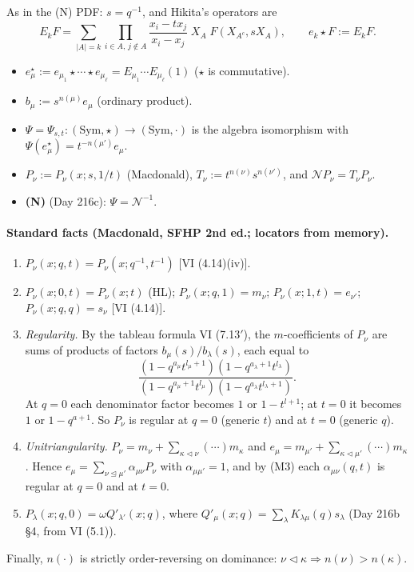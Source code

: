 \documentclass[11pt]{article}
\theoremstyle{definition}
\newcommand{\cN}{\mathcal{N}}
\newcommand{\domd}{\trianglelefteq}
\newcommand{\sdomd}{\triangleleft}
\begin{document}
As in the (N) PDF: $s=q^{-1}$, and Hikita's operators are
\[
E_kF=\sum_{|A|=k}\prod_{i\in A,\,j\notin A}\frac{x_i-tx_j}{x_i-x_j}\;X_A\;F(X_{A^c},sX_A),\qquad e_k\star F:=E_kF.
\]
\begin{itemize}[nosep]
\item $e^\star_\mu:=e_{\mu_1}\star\cdots\star e_{\mu_\ell}=E_{\mu_1}\cdots E_{\mu_\ell}(1)$ ($\star$ is commutative).
\item $b_\mu:=s^{n(\mu)}e_\mu$ (ordinary product).
\item $\Psi=\Psi_{s,t}:(\mathrm{Sym},\star)\to(\mathrm{Sym},\cdot)$ is the algebra isomorphism with $\Psi(e^\star_\mu)=t^{-n(\mu')}e_\mu$.
\item $P_\nu:=P_\nu(x;s,1/t)$ (Macdonald), $T_\nu:=t^{n(\nu)}s^{n(\nu')}$, and $\cN P_\nu=T_\nu P_\nu$.
\item \textbf{(N)} (Day 216c): $\Psi=\cN^{-1}$.
\end{itemize}

\paragraph{Standard facts (Macdonald, SFHP 2nd ed.; locators from memory).}
\begin{enumerate}[label=(M\arabic*),nosep]
\item $P_\nu(x;q,t)=P_\nu(x;q^{-1},t^{-1})$ [VI (4.14)(iv)].
\item $P_\nu(x;0,t)=P_\nu(x;t)$ (HL); $P_\nu(x;q,1)=m_\nu$; $P_\nu(x;1,t)=e_{\nu'}$; $P_\nu(x;q,q)=s_\nu$ [VI (4.14)].
\item \emph{Regularity.} By the tableau formula VI (7.13$'$), the $m$-coefficients of $P_\nu$ are sums of products of factors $b_\mu(s)/b_\lambda(s)$, each equal to
\[\frac{(1-q^{a_\mu}t^{l_\mu+1})(1-q^{a_\lambda+1}t^{l_\lambda})}{(1-q^{a_\mu+1}t^{l_\mu})(1-q^{a_\lambda}t^{l_\lambda+1})}.\]
At $q=0$ each denominator factor becomes $1$ or $1-t^{l+1}$; at $t=0$ it becomes $1$ or $1-q^{a+1}$. So $P_\nu$ is regular at $q=0$ (generic $t$) and at $t=0$ (generic $q$).
\item \emph{Unitriangularity.} $P_\nu=m_\nu+\sum_{\kappa\sdomd\nu}(\cdots)m_\kappa$ and $e_\mu=m_{\mu'}+\sum_{\kappa\sdomd\mu'}(\cdots)m_\kappa$. Hence $e_\mu=\sum_{\nu\domd\mu'}\alpha_{\mu\nu}P_\nu$ with $\alpha_{\mu\mu'}=1$, and by (M3) each $\alpha_{\mu\nu}(q,t)$ is regular at $q=0$ and at $t=0$.
\item $P_\lambda(x;q,0)=\omega Q'_{\lambda'}(x;q)$, where $Q'_\mu(x;q)=\sum_\lambda K_{\lambda\mu}(q)s_\lambda$ (Day 216b \S4, from VI (5.1)).
\end{enumerate}
Finally, $n(\cdot)$ is strictly order-reversing on dominance: $\nu\sdomd\kappa\Rightarrow n(\nu)>n(\kappa)$.
\end{document}
